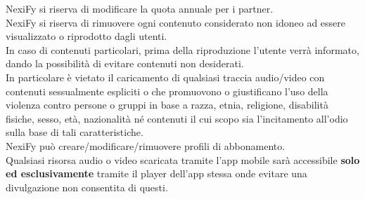 NexiFy si riserva di modificare la quota annuale per i partner.\\
NexiFy si riserva di rimuovere ogni contenuto considerato non idoneo ad essere visualizzato o riprodotto dagli utenti.\\
In caso di contenuti particolari, prima della riproduzione l'utente verrà informato, dando la possibilità di evitare contenuti non desiderati.\\
In particolare è vietato il caricamento di qualsiasi traccia audio/video con contenuti sessualmente espliciti o che promuovono o giustificano l'uso della violenza contro persone o gruppi in base a razza, etnia, religione, disabilità fisiche, sesso, età, nazionalità né contenuti il cui scopo sia l'incitamento all'odio sulla base di tali caratteristiche. \\
NexiFy può creare/modificare/rimuovere profili di abbonamento. \\
Qualsiasi risorsa audio o video scaricata tramite l'app mobile sarà accessibile \textbf{solo ed esclusivamente} tramite il player dell'app stessa onde evitare una divulgazione non consentita di questi.
 

